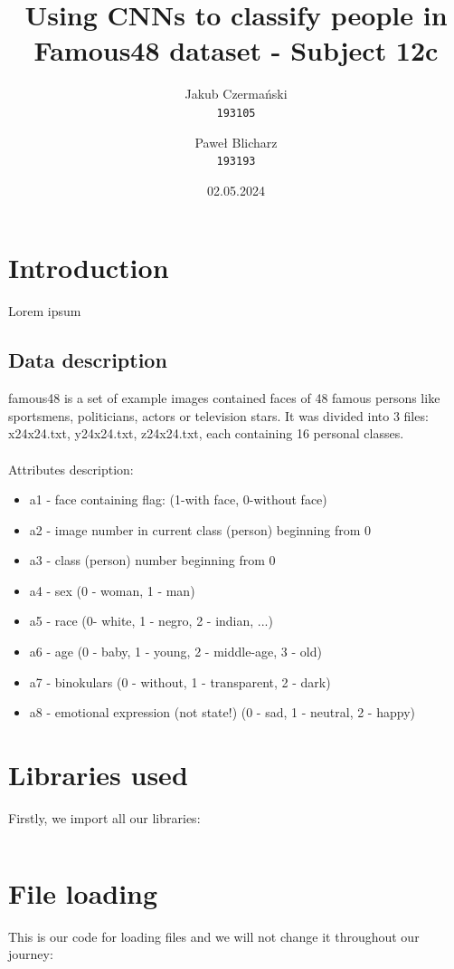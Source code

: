 \documentclass[12pt]{article}
\author{
  Jakub Czermański\\
  \texttt{193105}
  \and
  Paweł Blicharz\\
  \texttt{193193}
}
\date{02.05.2024}
\title{Using CNNs to classify people in Famous48 dataset - Subject 12c}
\begin{document}
  \maketitle
  \newpage
  \tableofcontents
  \newpage

  \section{Introduction}
    Lorem ipsum
    \subsection*{Data description}
      famous48 is a set of example images contained faces of 48 famous persons like sportsmens, politicians, actors or television stars. It was divided into 3 files: x24x24.txt, y24x24.txt, z24x24.txt, each containing 16 personal classes.
      \\\\
      Attributes description:
      \begin{itemize}
        \item a1 - face containing flag: (1-with face, 0-without face)
        \item a2 - image number in current class (person) beginning from 0
        \item a3 - class (person) number beginning from 0
        \item a4 - sex (0 - woman, 1 - man)
        \item a5 - race (0- white, 1 - negro, 2 - indian, ...)
        \item a6 - age (0 - baby, 1 - young, 2 - middle-age, 3 - old)
        \item a7 - binokulars (0 - without, 1 - transparent, 2 - dark)
        \item a8 - emotional expression (not state!) (0 - sad, 1 - neutral, 2 - happy)
      \end{itemize}
  \section{Libraries used}
    Firstly, we import all our libraries:
    \inputminted[linenos]{python}{code/imports.py}
  \section{File loading}
    This is our code for loading files and we will not change it throughout our journey:
    \inputminted[linenos]{python}{code/loading.py}
\end{document}
